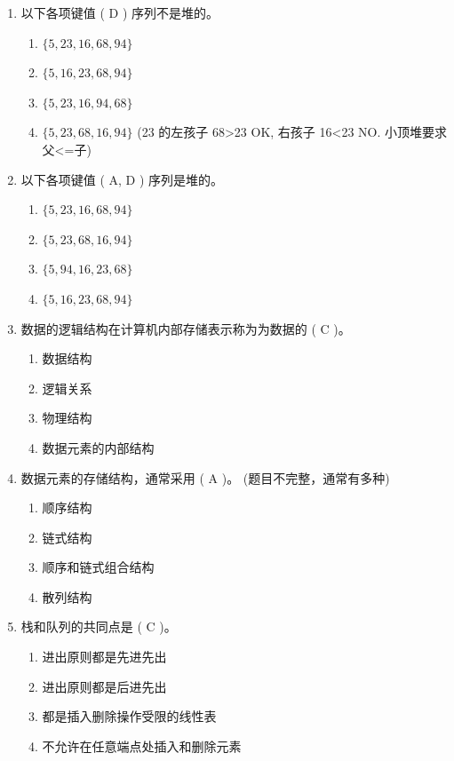 \documentclass[12pt, a4paper]{article}
\begin{document}
\begin{enumerate}[label=\arabic*.]
    \item 以下各项键值 ( D ) 序列不是堆的。
    \begin{enumerate}
        \item $\{5, 23, 16, 68, 94\}$
        \item $\{5, 16, 23, 68, 94\}$
        \item $\{5, 23, 16, 94, 68\}$
        \item $\{5, 23, 68, 16, 94\}$ (23 的左孩子 68>23 OK, 右孩子 16<23 NO. 小顶堆要求父<=子)
    \end{enumerate}

    \item 以下各项键值 ( A, D ) 序列是堆的。
    \begin{enumerate}
        \item $\{5, 23, 16, 68, 94\}$
        \item $\{5, 23, 68, 16, 94\}$
        \item $\{5, 94, 16, 23, 68\}$
        \item $\{5, 16, 23, 68, 94\}$
    \end{enumerate}

    \item 数据的逻辑结构在计算机内部存储表示称为为数据的 ( C )。
    \begin{enumerate}
        \item 数据结构
        \item 逻辑关系
        \item 物理结构
        \item 数据元素的内部结构
    \end{enumerate}

    \item 数据元素的存储结构，通常采用 ( A )。 (题目不完整，通常有多种)
    \begin{enumerate}
        \item 顺序结构
        \item 链式结构
        \item 顺序和链式组合结构
        \item 散列结构
    \end{enumerate}

    \item 栈和队列的共同点是 ( C )。
    \begin{enumerate}
        \item 进出原则都是先进先出
        \item 进出原则都是后进先出
        \item 都是插入删除操作受限的线性表
        \item 不允许在任意端点处插入和删除元素
    \end{enumerate}


\end{enumerate}
\end{document}
